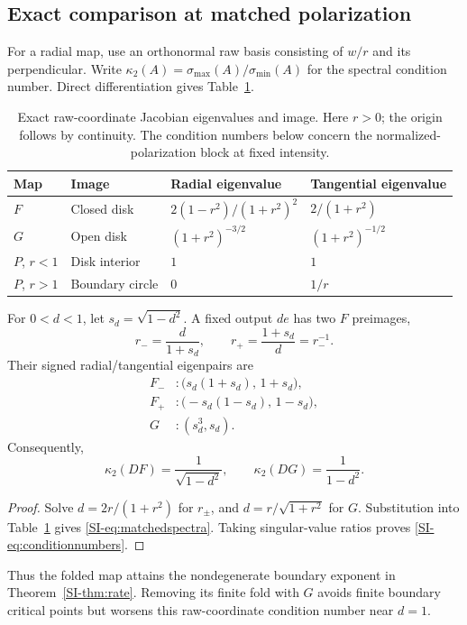 \subsection{Exact comparison at matched polarization}
For a radial map, use an orthonormal raw basis consisting of $w/r$ and its perpendicular. Write $\kappa_2(A)=\sigma_{\max}(A)/\sigma_{\min}(A)$ for the spectral condition number. Direct differentiation gives Table~\ref{SI-tab:spectra}.
\begin{table}[!t]
\caption{Exact raw-coordinate Jacobian eigenvalues and image. Here $r>0$; the origin follows by continuity. The condition numbers below concern the normalized-polarization block at fixed intensity.}
\label{SI-tab:spectra}
\centering\small\renewcommand{\arraystretch}{1.15}
\begin{tabular}{@{}llll@{}}\toprule
Map & Image & Radial eigenvalue & Tangential eigenvalue\\\midrule
$F$ & Closed disk & $2(1-r^2)/(1+r^2)^2$ & $2/(1+r^2)$\\
$G$ & Open disk & $(1+r^2)^{-3/2}$ & $(1+r^2)^{-1/2}$\\
$P$, $r<1$ & Disk interior & $1$ & $1$\\
$P$, $r>1$ & Boundary circle & $0$ & $1/r$\\\bottomrule
\end{tabular}
\end{table}

\begin{proposition}
\label{SI-prop:spectra}
For $0<d<1$, let $s_d=\sqrt{1-d^2}$. A fixed output $de$ has two $F$ preimages,
\begin{equation}
 r_-=\frac{d}{1+s_d},\qquad r_+=\frac{1+s_d}{d}=r_-^{-1}.
 \label{SI-eq:inverse}
\end{equation}
Their signed radial/tangential eigenpairs are
\begin{equation}
 \begin{aligned}
 F_- &: \bigl(s_d(1+s_d),\,1+s_d\bigr),\\
 F_+ &: \bigl(-s_d(1-s_d),\,1-s_d\bigr),\\
 G &: (s_d^3,s_d).
 \end{aligned}
 \label{SI-eq:matchedspectra}
\end{equation}
Consequently,
\begin{equation}
 \kappa_2(DF)=\frac1{\sqrt{1-d^2}},\qquad
 \kappa_2(DG)=\frac1{1-d^2}.
 \label{SI-eq:conditionnumbers}
\end{equation}
\end{proposition}
\begin{proof}
Solve $d=2r/(1+r^2)$ for $r_\pm$, and $d=r/\sqrt{1+r^2}$ for $G$. Substitution into Table~\ref{SI-tab:spectra} gives \eqref{SI-eq:matchedspectra}. Taking singular-value ratios proves \eqref{SI-eq:conditionnumbers}.
\end{proof}
Thus the folded map attains the nondegenerate boundary exponent in Theorem~\ref{SI-thm:rate}. Removing its finite fold with $G$ avoids finite boundary critical points but worsens this raw-coordinate condition number near $d=1$.

